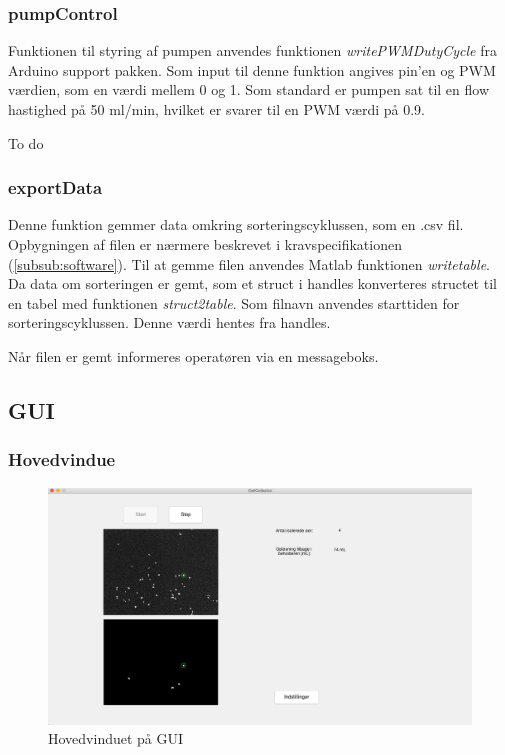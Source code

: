 \subsubsection{pumpControl}
Funktionen til styring af pumpen anvendes funktionen \textit{writePWMDutyCycle} fra Arduino support pakken. Som input til denne funktion angives pin'en og PWM værdien, som en værdi mellem 0 og 1. Som standard er pumpen sat til en flow hastighed på 50 ml/min, hvilket er svarer til en PWM værdi på 0.9. 

To do
\subsubsection{exportData}
Denne funktion gemmer data omkring sorteringscyklussen, som en .csv fil. Opbygningen af filen er nærmere beskrevet i kravspecifikationen (\ref{subsub:software}). Til at gemme filen anvendes Matlab funktionen \textit{writetable}. Da data om sorteringen er gemt, som et struct i handles konverteres structet til en tabel med funktionen \textit{struct2table}. Som filnavn anvendes starttiden for sorteringscyklussen. Denne værdi hentes fra handles.

Når filen er gemt informeres operatøren via en messageboks. 

\newpage
\subsection{GUI}
\subsubsection{Hovedvindue}
\begin{figure}[H]
	\centering
	\includegraphics[width=1\textwidth]{billeder/software/gui_main.png}
	\caption{Hovedvinduet på GUI}
	\label{fig:finishedGUI}
\end{figure}

